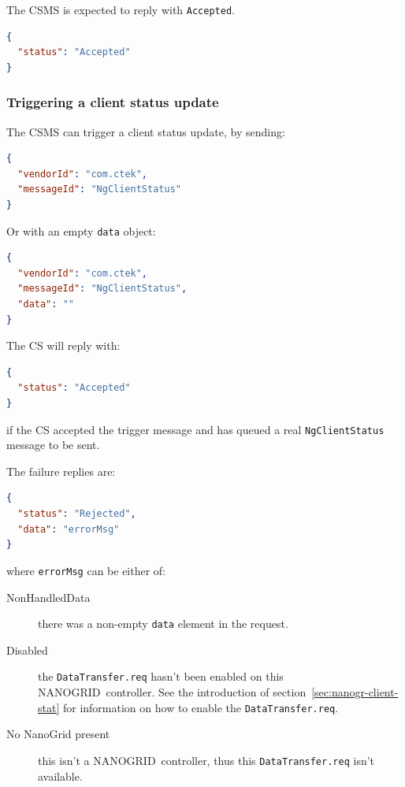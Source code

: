 \documentclass{scrartcl}
\newcommand{\nanogrid}{NANOGRID\texttrademark}
\begin{document}
The CSMS is expected to reply with \verb|Accepted|.
\begin{lstlisting}[language=json,caption={DataTransfer.conf for NgClientStatus
sent to the CS},captionpos=t]
{
  "status": "Accepted"
}
\end{lstlisting}


\subsubsection{Triggering a client status update}
\label{sec:trigg-client-stat}

The CSMS can trigger a client status update, by sending:

\begin{lstlisting}[language=json,caption={DataTransfer.req to trigger an
NgClientStatus. This trigger message is sent from the CSMS.},captionpos=t]
{
  "vendorId": "com.ctek",
  "messageId": "NgClientStatus"
}
\end{lstlisting}
Or with an empty \verb|data| object:
\begin{lstlisting}[language=json,caption={DataTransfer.req  to trigger an
NgClientStatus. This trigger message is sent from the CSMS.},captionpos=t]
{
  "vendorId": "com.ctek",
  "messageId": "NgClientStatus",
  "data": ""
}
\end{lstlisting}

The CS will reply with:
\begin{lstlisting}[language=json,caption={DataTransfer.conf for the trigger
version of NgClientStatus sent from the CS},captionpos=t]
{
  "status": "Accepted"
}
\end{lstlisting}
if the CS accepted the trigger message and has queued a real
\verb|NgClientStatus| message to be sent.

The failure replies are:
\begin{lstlisting}[language=json,caption={DataTransfer.conf for the trigger
version of NgClientStatus sent from the CS},captionpos=t]
{
  "status": "Rejected",
  "data": "errorMsg"
}
\end{lstlisting}
where \verb|errorMsg| can be either of:
\begin{description}
\item[NonHandledData] there was a non-empty \verb|data| element in the
  request.
\item[Disabled] the \verb|DataTransfer.req| hasn't been enabled on this
  \nanogrid\ controller. See the introduction of
  section~\ref{sec:nanogr-client-stat} for information on how to enable the
  \verb|DataTransfer.req|.
\item[No NanoGrid present] this isn't a \nanogrid\ controller, thus this
  \verb|DataTransfer.req| isn't available.
\end{description}
\end{document}
